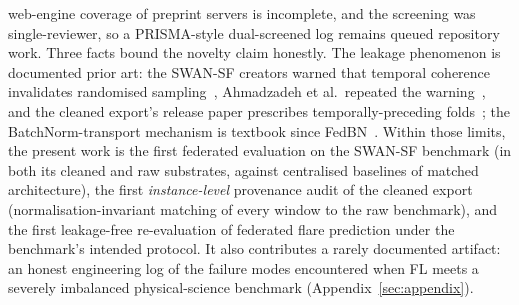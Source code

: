 web-engine coverage of preprint servers is incomplete, and the
screening was single-reviewer, so a PRISMA-style dual-screened log
remains queued repository work. Three facts bound the novelty claim honestly. The leakage
phenomenon is documented prior art: the SWAN-SF creators warned that
temporal coherence invalidates randomised
sampling~\cite{angryk2019}, Ahmadzadeh et al.\ repeated the
warning~\cite{ahmadzadeh2021}, and the cleaned export's release paper
prescribes temporally-preceding folds~\cite{eskandari2024}; the
BatchNorm-transport mechanism is textbook since
FedBN~\cite{li2021fedbn}. Within those limits, the present work is
the first federated evaluation on the SWAN-SF benchmark (in both
its cleaned and raw substrates, against centralised baselines of
matched architecture), the first \emph{instance-level} provenance
audit of the cleaned export (normalisation-invariant matching of
every window to the raw benchmark), and the first leakage-free
re-evaluation of federated flare prediction under the benchmark's
intended protocol. It also contributes a rarely documented artifact:
an honest engineering log of the failure modes encountered when FL
meets a severely imbalanced physical-science benchmark
(Appendix~\ref{sec:appendix}).
